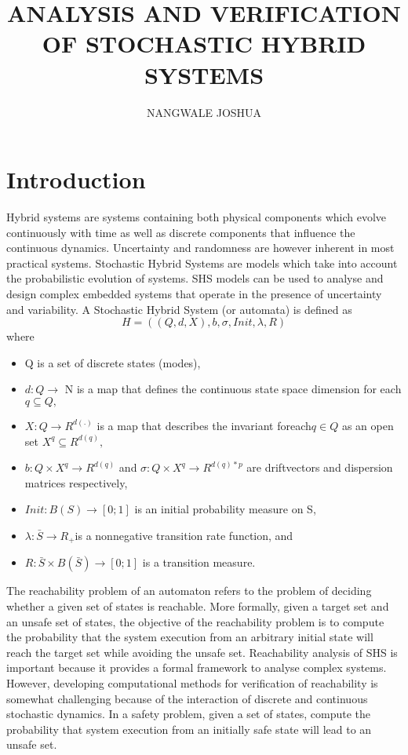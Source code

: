 \documentclass{article}
\begin{document}
\title{ANALYSIS AND VERIFICATION OF STOCHASTIC HYBRID SYSTEMS}
\author{NANGWALE JOSHUA}
\maketitle

\section{Introduction}
Hybrid systems are systems containing both physical components which evolve continuously with time as well as discrete components that influence the continuous dynamics. Uncertainty and randomness are however inherent in most practical systems.  Stochastic Hybrid Systems are models which take into account the probabilistic evolution of systems. SHS models can be used to analyse and design complex embedded systems that operate in the presence of uncertainty and variability. A Stochastic Hybrid System (or automata) is defined as $$ H=((Q,d,X),b,\sigma,Init,\lambda,R)$$ where
\begin{itemize}
\item Q is a set of discrete states (modes),
\item $d : Q \rightarrow$ N is a map that defines the continuous state space dimension for each $q \subseteq Q,$
\item $X : Q \rightarrow R^{d(.)}$ is a map that describes the invariant foreach$ q \in Q$ as an open set $X^q \subseteq R^{d(q)},$
 \item $b : Q \times X^q \rightarrow R^{d(q)}$ and $ \sigma : Q \times X^q \rightarrow R^{d(q)*p}$ are driftvectors and dispersion matrices respectively,
\item $ Init : B(S) \rightarrow [0; 1]$ is an initial probability measure on S,
\item $\lambda : \bar{S} \rightarrow R_{+} $is a nonnegative transition rate function, and
\item $ R : \bar{S} \times B(\bar{S}) \rightarrow [0; 1]$ is a transition measure.
\end{itemize}
The reachability problem of an automaton refers to the problem of deciding whether a given set of states is reachable. More formally, given a target set and an unsafe set of states, the objective  of the reachability problem is to compute the probability that the system execution from an arbitrary initial state will reach the target set while avoiding the unsafe set. Reachability analysis of SHS is important because it provides a formal framework to analyse complex systems. However, developing computational methods for verification of reachability is somewhat challenging because of the interaction of discrete and continuous stochastic dynamics.
In a safety problem, given a set of states, compute the probability that system execution from an initially safe state will lead to an unsafe set.
\end{document}
